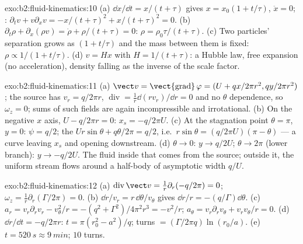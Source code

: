 \begin{solution}{exo:b2:fluid-kinematics:10}
(a) $\dd x/\dd t = x/(t + \tau)$ gives $x = x_0(1 + t/\tau)$, $\ddot x = 0$;
: $\partial_tv + v\partial_xv = -x/(t + \tau)^2 + x/(t + \tau)^2
= 0$. (b) $\partial_t\rho + \partial_x(\rho v) = \dot\rho + \rho/(t + \tau) = 0$: $\rho =
\rho_0\tau/(t + \tau)$. (c) Two particles' separation grows as $(1 + t/\tau)$
and the mass between them is fixed: $\rho \propto 1/(1 + t/\tau)$. (d) $v =
Hx$ with $H = 1/(t + \tau)$: a Hubble law, free expansion (no
acceleration), density falling as the inverse of the scale factor.
\end{solution}

\begin{solution}{exo:b2:fluid-kinematics:11}
(a) $\vect v = \operatorname{\vect{grad}}\varphi = (U + qx/2\pi r^2, qy/2\pi r^2)$;
the source has $v_r = q/2\pi r$, $\operatorname{div} = \frac1r\dd(rv_r)/\dd r
= 0$ and no $\theta$ dependence, so $\omega_z = 0$; sums of such fields are
again incompressible and irrotational. (b) On the negative $x$ axis,
$U - q/2\pi r = 0$: $x_s = -q/2\pi U$. (c) At the stagnation point $\theta =
\pi$, $y = 0$: $\psi = q/2$; the  $Ur\sin\theta + q\theta/2\pi = q/2$,
i.e.\ $r\sin\theta = (q/2\pi U)(\pi - \theta)$ --- a curve leaving $x_s$ and
opening downstream. (d) $\theta \to 0$: $y \to q/2U$; $\theta \to 2\pi$ (lower
branch): $y \to -q/2U$. The fluid inside that  comes from the
source; outside it, the uniform stream flows around a half-body of
asymptotic width $q/U$.
\end{solution}

\begin{solution}{exo:b2:fluid-kinematics:12}
(a) $\operatorname{div}\vect v = \frac1r\partial_r(-q/2\pi) = 0$; $\omega_z =
\frac1r\partial_r(\Gamma/2\pi) = 0$. (b) $\dd r/v_r = r\,\dd\theta/v_\theta$ gives
$\dd r/r = -(q/\Gamma)\dd\theta$. (c) $a_r = v_r\partial_rv_r - v_\theta^2/r =
-(q^2 + \Gamma^2)/4\pi^2r^3 = -v^2/r$; $a_\theta = v_r\partial_rv_\theta + v_rv_\theta/r
= 0$. (d) $\dd r/\dd t = -q/2\pi r$: $t = \pi(r_0^2 - a^2)/q$; turns
$= (\Gamma/2\pi q)\ln(r_0/a)$. (e) $t = \qty{520}{s} \approx \qty{9}{min}$; $10$
turns.
\end{solution}

